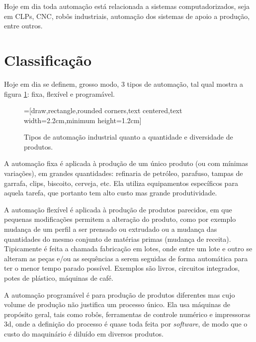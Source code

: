 Hoje em dia toda automação está relacionada a sistemas computadorizados, seja em CLPs, CNC, robôs industriais, automação dos sistemas de apoio a produção, entre outros.

\section{Classificação}

Hoje em dia se definem, grosso modo, 3 tipos de automação, tal qual mostra a figura \ref{fig:tipos_automacao}: fixa, flexível e programável.
\begin{figure}[hbt]
	\begin{center}
	=[draw,rectangle,rounded corners,text centered,text width=2.2cm,minimum height=1.2cm]
	\end{center}
	\caption{Tipos de automação industrial quanto a quantidade e diversidade de produtos.}
	\label{fig:tipos_automacao}
\end{figure}

A automação fixa é aplicada à produção de um único produto (ou com mínimas variações), em grandes quantidades: refinaria de petróleo, parafuso, tampas de garrafa, clips, biscoito, cerveja, etc. Ela utiliza equipamentos específicos para aquela tarefa, que portanto tem alto custo mas grande produtividade.

A automação flexível é aplicada à produção de produtos parecidos, em que pequenas modificações permitem a alteração do produto, como por exemplo mudança de um perfil a ser prensado ou extrudado ou a mudança das quantidades do mesmo conjunto de matérias primas (mudança de receita). Tipicamente é feita a chamada fabricação em lotes, onde entre um lote e outro se alteram as peças e/ou as sequências a serem seguidas de forma automática para ter o menor tempo parado possível. Exemplos são livros, circuitos integrados, potes de plástico, máquinas de café.

A automação programável é para produção de produtos diferentes mas cujo volume de produção não justifica um processo único. Ela usa máquinas de propósito geral, tais como robôs, ferramentas de controle numérico e impressoras 3d, onde a definição do processo é quase toda feita por \emph{software}, de modo que o custo do maquinário é diluído em diversos produtos.

